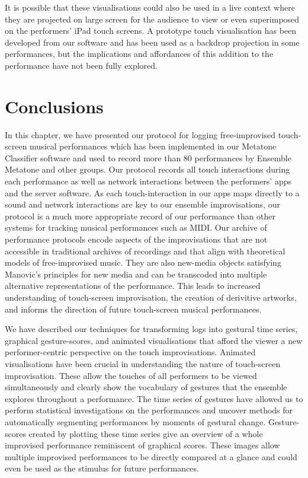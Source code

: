 \documentclass[graybox]{svmult}
\begin{document}
It is possible that these visualisations could also be used in a live
context where they are projected on large screen for the audience to
view or even superimposed on the performers' iPad touch screens. A
prototype touch visualisation has been developed from our software and
has been used as a backdrop projection in some performances, but the
implications and affordances of this addition to the performance have
not been fully explored.

\section{Conclusions}

In this chapter, we have presented our protocol for logging
free-improvised touch-screen musical performances which has been
implemented in our Metatone Classifier software and used to record
more than 80 performances by Ensemble Metatone and other groups. Our
protocol records all touch interactions during each performance as
well as network interactions between the performers' apps and the
server software. As each touch-interaction in our apps maps directly
to a sound and network interactions are key to our ensemble
improvisations, our protocol is a much more appropriate record of our
performance than other systems for tracking musical performances such
as MIDI. Our archive of performance protocols encode aspects of the
improvisations that are not accessible in traditional archives of
recordings and that align with theoretical models of free-improvised
music. They are also new-media objects satisfying Manovic's principles
for new media and can be transcoded into multiple alternative
representations of the performance. This leads to increased
understanding of touch-screen improvisation, the creation of
derivitive artworks, and informs the direction of future touch-screen
musical performances.

We have described our techniques for transforming logs into gestural
time series, graphical gesture-scores, and animated visualisations
that afford the viewer a new performer-centric perspective on the
touch improvisations. Animated visualisations have been crucial in
understanding the nature of touch-screen improvisation. These allow
the touches of all performers to be viewed simultaneously and clearly
show the vocabulary of gestures that the ensemble explores throughout
a performance. The time series of gestures have allowed us to perform
statistical investigations on the performances and uncover methods for
automatically segmenting performances by moments of gestural change.
Gesture-scores created by plotting these time series give an overview
of a whole improvised performance reminiscent of graphical scores.
These images allow multiple improvised performances to be directly
compared at a glance and could even be used as the stimulus for future
performances.
\end{document}
